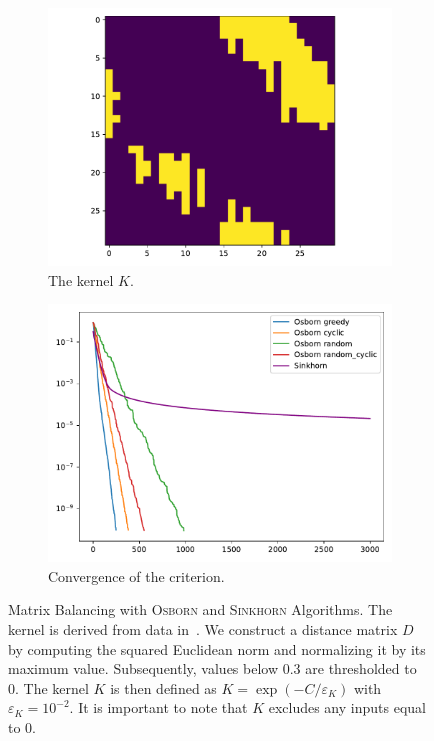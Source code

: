 \begin{figure}[H]
    \centering
    \begin{subfigure}[b]{.45\textwidth}
        \centering
        \includegraphics[width=\textwidth]{figures/sparse_test/K.pdf}
        \caption{The kernel \(K\).}
    \end{subfigure}
    \hfill
    \begin{subfigure}[b]{.45\textwidth}
        \centering
        \includegraphics[width=\textwidth]{figures/sparse_test/conv}
        \caption{Convergence of the criterion.}
    \end{subfigure}
    \caption{Matrix Balancing with \textsc{Osborn} and \textsc{Sinkhorn} Algorithms. The kernel is derived from data in~. We construct a distance matrix \(D\) by computing the squared Euclidean norm and normalizing it by its maximum value. Subsequently, values below \(0.3\) are thresholded to 0. The kernel \(K\) is then defined as \(K = \exp(-C/\varepsilon_K)\) with \(\varepsilon_K = 10^{-2}\). It is important to note that \(K\) excludes any inputs equal to 0.}\label{ill}
\end{figure}


